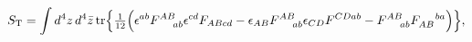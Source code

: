 \begin{equation}
\label{2.3}
S_{\rm T} = \int d^4z\, d^4\bar{z}\, {\rm tr} \Bigr\{
\hbox{$\frac{1}{12}$} \Bigr(
\epsilon^{ab} F^{AB}_{\!~~~~ab} \epsilon^{cd} F_{AB cd} -
\epsilon_{AB} F^{AB}_{\!~~~~ab} \epsilon_{CD} F^{CD ab} -
F^{AB}_{\!~~~~ab} F_{AB}^{\!~~~~ba} \Bigr) \Bigr\},
\end{equation}

